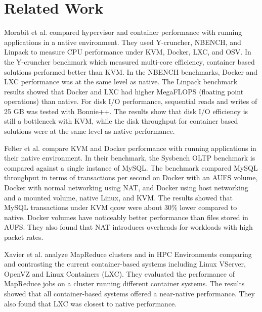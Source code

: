 \documentclass[11pt]{article}
\begin{document}
\section{Related Work}
Morabit et al. \cite{morabito} compared hypervisor and container performance with running applications in a native environment. They used Y-cruncher, NBENCH, and Linpack to measure CPU performance under KVM, Docker, LXC, and OSV. In the Y-cruncher benchmark which measured multi-core efficiency, container based solutions performed better than KVM. In the NBENCH benchmarks, Docker and LXC performance was at the same level as native. The Linpack benchmark results showed that Docker and LXC had higher MegaFLOPS (floating point operations) than native. For disk I/O performance, sequential reads and writes of 25 GB was tested with Bonnie++. The results show that disk I/O efficiency is still a bottleneck with KVM, while the disk throughput for container based solutions were at the same level as native performance.

Felter et al. \cite{felter} compare KVM and Docker performance with running applications in their native environment. In their benchmark, the Sysbench OLTP benchmark is compared against a single instance of MySQL. The benchmark compared MySQL throughput in terms of transactions per second on Docker with an AUFS volume, Docker with normal networking using NAT, and Docker using host networking and a mounted volume, native Linux, and KVM. The results showed that MySQL transactions under KVM qcow were about 30\% lower compared to native. Docker volumes have noticeably better performance than files stored in AUFS. They also found that NAT introduces overheads for workloads with high packet rates.

Xavier et al. \cite{xavier} analyze MapReduce clusters and in HPC Environments comparing and contrasting the current container-based systems including Linux VServer, OpenVZ and Linux Containers (LXC). They evaluated the performance of MapReduce jobs on a cluster running different container systems. The results showed that all container-based systems offered a near-native performance. They also found that LXC was closest to native performance.
\end{document}
